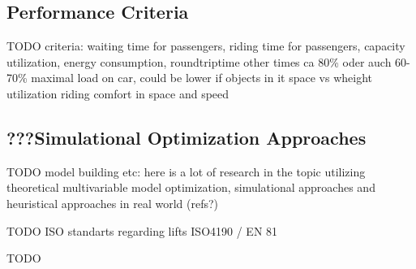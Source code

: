 \subsection{Performance Criteria}
TODO
criteria: waiting time for passengers, riding time for passengers, capacity utilization, energy consumption, roundtriptime other times
ca 80\% oder auch 60-70\% maximal load on car, could be lower if objects in it
space vs wheight utilization
riding comfort in space and speed

\subsection{???Simulational Optimization Approaches}
TODO
model building etc: here is a lot of research in the topic utilizing theoretical multivariable model optimization, simulational approaches and heuristical approaches in real world (refs?)

TODO
ISO standarts regarding lifts ISO4190 / EN 81

TODO
